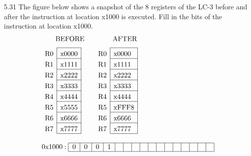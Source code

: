 \documentclass{patt}
\begin{document}
\begin{exercises}
\item[5.31] The figure below shows a snapshot of the 8 registers of 
  the LC-3 before and after the instruction at location x1000 is 
  executed. Fill in the bits of the instruction at location x1000.
{\fontsize{9}{11}\selectfont\begin{align*}
&\begin{matrix}
\qquad\text{BEFORE}\\
\noalign{\vspace{.5pc}}
\begin{array}{@{}c|c|@{}}
\cline{2-2}\rule{0pc}{1pc}
{\rm R0} & {\rm x0000}\\
\cline{2-2}\rule{0pc}{1pc}
{\rm R1} & {\rm x1111}\\
\cline{2-2}\rule{0pc}{1pc}
{\rm R2} & {\rm x2222}\\
\cline{2-2}\rule{0pc}{1pc}
{\rm R3} & {\rm x3333}\\
\cline{2-2}\rule{0pc}{1pc}
{\rm R4} & {\rm x4444}\\
\cline{2-2}\rule{0pc}{1pc}
{\rm R5} & {\rm x5555}\\
\cline{2-2}\rule{0pc}{1pc}
{\rm R6} & {\rm x6666}\\
\cline{2-2}\rule{0pc}{1pc}
{\rm R7} & {\rm x7777}\\
\cline{2-2}\end{array}\end{matrix}\qquad\begin{matrix}
\qquad\text{AFTER}\\
\noalign{\vspace{.5pc}}
\begin{array}{@{}l|l|@{}}
\cline{2-2}\rule{0pc}{1pc}
{\rm R0} &{\rm x0000}\\
\cline{2-2}\rule{0pc}{1pc}
{\rm R1} & {\rm x1111}\\
\cline{2-2}\rule{0pc}{1pc}
{\rm R2} & {\rm x2222}\\
\cline{2-2}\rule{0pc}{1pc}
{\rm R3} & {\rm x3333}\\
\cline{2-2}\rule{0pc}{1pc}
{\rm R4} & {\rm x4444}\\
\cline{2-2}\rule{0pc}{1pc}
{\rm R5} & {\rm xFFF8}\\
\cline{2-2}\rule{0pc}{1pc}
{\rm R6} & {\rm x6666}\\
\cline{2-2}\rule{0pc}{1pc}
{\rm R7} & {\rm x7777}\\
\cline{2-2}\end{array}\end{matrix}\\
\noalign{\vspace{.8pc}}
&0\hbox{x}1000: \begin{tabular}{|l|l|l|l|l|l|l|l|l|l|l|l|l|l|l|l|}
\hline
0 & 0 & 0 & 1 &&&&&&&&&&&& \\
\hline
\end{tabular}
\end{align*}}


\end{exercises}
\end{document}
